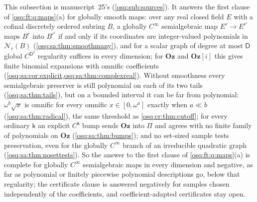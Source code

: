 \documentclass[11pt,letterpaper]{article}
\numberwithin{equation}{section}
\theoremstyle{definition}
\theoremstyle{remark}
\theoremstyle{plain}
\newcommand{\Oz}{\mathbf{Oz}}
\newcommand{\GOz}{\Oz[i]}
\newcommand{\Num}{\mathscr N}
\begin{document}
This subsection is manuscript~25's (\cref{osq:sub:sources}). It answers the first clause of \cref{osq:ft:q:maps}(a) for globally smooth maps: over any
real closed field $E$ with a cofinal discretely ordered subring $B$, a globally $C^\infty$ semialgebraic map $E^r\to E^{r'}$ maps $B^r$ into $B^{r'}$ if
and only if its coordinates are integer-valued polynomials in $\Num_r(B)$ (\cref{osq:sa:thm:smoothmany}), and for a scalar graph of degree at most
$\mathsf D$ global $C^{\mathsf D^2}$ regularity suffices in every dimension; for $\Oz$ and $\GOz$ this gives finite binomial expansions with omnific
coefficients (\cref{osq:sa:cor:explicit,osq:sa:thm:complexreal}). Without smoothness every semialgebraic preserver is still polynomial on each of its
two tails (\cref{osq:sa:thm:tails}), but on a bounded interval it can be far from polynomial: $\omega^b\sqrt x$ is omnific for every omnific $x\in[0,
\omega^a]$ exactly when $a\ll b$ (\cref{osq:sa:thm:radical}), the same threshold as \cref{osq:cr:thm:cutoff}; for every ordinary $\mathsf k$ an explicit
$C^{\mathsf k}$ bump sends $\Oz$ into $\Pi$ and agrees with no finite family of polynomials on $\Oz$ (\cref{osq:sa:thm:bumps}); and no set-sized sample
tests preservation, even for the globally $C^\infty$ branch of an irreducible quadratic graph (\cref{osq:sa:thm:nosettests}). So the answer to the first
clause of \cref{osq:ft:q:maps}(a) is complete for globally $C^\infty$ semialgebraic maps in every dimension and negative, as far as polynomial or
finitely piecewise polynomial descriptions go, below that regularity; the certificate clause is answered negatively for samples chosen independently of
the coefficients, and coefficient-adapted certificates stay open.
\end{document}
